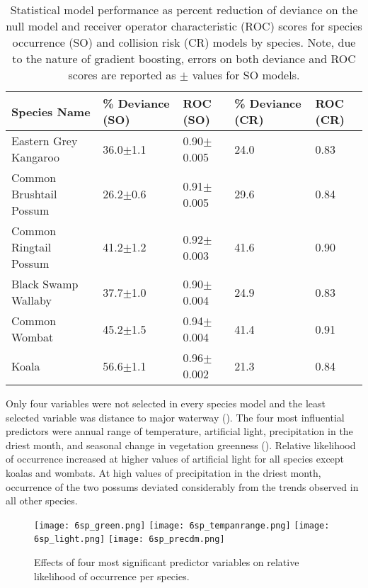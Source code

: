 \begin{table}[htp]
\caption{Statistical model performance as percent reduction of deviance on the null model and receiver operator characteristic (ROC) scores for species occurrence (SO) and collision risk (CR) models by species. Note, due to the nature of gradient boosting, errors on both deviance and ROC scores are reported as $\pm$ values for SO models.}
\begin{tabularx}{\textwidth}{lllll} \toprule
Species Name			&\% Deviance (SO)	&ROC (SO)			&\% Deviance (CR)	&ROC (CR)\\
\midrule 
Eastern Grey Kangaroo	& 36.0$\pm$1.1 		& 0.90$\pm$0.005	& 24.0 				& 0.83 \\ 
Common Brushtail Possum & 26.2$\pm$0.6 		& 0.91$\pm$0.005 	& 29.6 				& 0.84 \\ 
Common Ringtail Possum 	& 41.2$\pm$1.2 		& 0.92$\pm$0.003 	& 41.6 				& 0.90 \\ 
Black Swamp Wallaby 	& 37.7$\pm$1.0 		& 0.90$\pm$0.004 	& 24.9 				& 0.83 \\ 
Common Wombat 			& 45.2$\pm$1.5 		& 0.94$\pm$0.004 	& 41.4 				& 0.91 \\ 
Koala 					& 56.6$\pm$1.1 		& 0.96$\pm$0.002 	& 21.3 				& 0.84 \\ 
\bottomrule
\end{tabularx}
\label{6sp_models}
\end{table}

Only four variables were not selected in every species model and the least selected variable was distance to major waterway (). The four most influential predictors were annual range of temperature, artificial light, precipitation in the driest month, and seasonal change in vegetation greenness (). Relative likelihood of occurrence increased at higher values of artificial light for all species except koalas and wombats. At high values of precipitation in the driest month, occurrence of the two possums deviated considerably from the trends observed in all other species. 

\begin{figure*}[htp]
  \centering
  \texttt{[image: 6sp\_green.png]}
  \texttt{[image: 6sp\_tempanrange.png]}
  \texttt{[image: 6sp\_light.png]}
  \texttt{[image: 6sp\_precdm.png]}
  \caption[]{Effects of four most significant predictor variables on relative likelihood of occurrence per species.}
  \label{6sp_term_occ}
\end{figure*}

